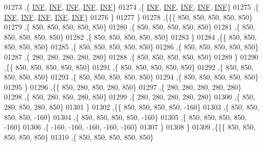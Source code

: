 \begin{DoxyCode}
01273    ,\{   \mbox{\hyperlink{energy__const_8h_a12c2040f25d8e3a7b9e1c2024c618cb6}{INF}},   \mbox{\hyperlink{energy__const_8h_a12c2040f25d8e3a7b9e1c2024c618cb6}{INF}},   \mbox{\hyperlink{energy__const_8h_a12c2040f25d8e3a7b9e1c2024c618cb6}{INF}},   \mbox{\hyperlink{energy__const_8h_a12c2040f25d8e3a7b9e1c2024c618cb6}{INF}},   \mbox{\hyperlink{energy__const_8h_a12c2040f25d8e3a7b9e1c2024c618cb6}{INF}}\}
01274    ,\{   \mbox{\hyperlink{energy__const_8h_a12c2040f25d8e3a7b9e1c2024c618cb6}{INF}},   \mbox{\hyperlink{energy__const_8h_a12c2040f25d8e3a7b9e1c2024c618cb6}{INF}},   \mbox{\hyperlink{energy__const_8h_a12c2040f25d8e3a7b9e1c2024c618cb6}{INF}},   \mbox{\hyperlink{energy__const_8h_a12c2040f25d8e3a7b9e1c2024c618cb6}{INF}},   \mbox{\hyperlink{energy__const_8h_a12c2040f25d8e3a7b9e1c2024c618cb6}{INF}}\}
01275    ,\{   \mbox{\hyperlink{energy__const_8h_a12c2040f25d8e3a7b9e1c2024c618cb6}{INF}},   \mbox{\hyperlink{energy__const_8h_a12c2040f25d8e3a7b9e1c2024c618cb6}{INF}},   \mbox{\hyperlink{energy__const_8h_a12c2040f25d8e3a7b9e1c2024c618cb6}{INF}},   \mbox{\hyperlink{energy__const_8h_a12c2040f25d8e3a7b9e1c2024c618cb6}{INF}},   \mbox{\hyperlink{energy__const_8h_a12c2040f25d8e3a7b9e1c2024c618cb6}{INF}}\}
01276    \}
01277   \}
01278  ,\{\{\{   850,   850,   850,   850,   850\}
01279    ,\{   850,   850,   850,   850,   850\}
01280    ,\{   850,   850,   850,   850,   850\}
01281    ,\{   850,   850,   850,   850,   850\}
01282    ,\{   850,   850,   850,   850,   850\}
01283    \}
01284   ,\{\{   850,   850,   850,   850,   850\}
01285    ,\{   850,   850,   850,   850,   850\}
01286    ,\{   850,   850,   850,   850,   850\}
01287    ,\{   280,   280,   280,   280,   280\}
01288    ,\{   850,   850,   850,   850,   850\}
01289    \}
01290   ,\{\{   850,   850,   850,   850,   850\}
01291    ,\{   850,   850,   850,   850,   850\}
01292    ,\{   850,   850,   850,   850,   850\}
01293    ,\{   850,   850,   850,   850,   850\}
01294    ,\{   850,   850,   850,   850,   850\}
01295    \}
01296   ,\{\{   850,   280,   850,   280,   850\}
01297    ,\{   280,   280,   280,   280,   280\}
01298    ,\{   850,   280,   850,   280,   850\}
01299    ,\{   280,   280,   280,   280,   280\}
01300    ,\{   850,   280,   850,   280,   850\}
01301    \}
01302   ,\{\{   850,   850,   850,   850,  -160\}
01303    ,\{   850,   850,   850,   850,  -160\}
01304    ,\{   850,   850,   850,   850,  -160\}
01305    ,\{   850,   850,   850,   850,  -160\}
01306    ,\{  -160,  -160,  -160,  -160,  -160\}
01307    \}
01308   \}
01309  ,\{\{\{   850,   850,   850,   850,   850\}
01310    ,\{   850,   850,   850,   850,   850\}

\end{DoxyCode}

